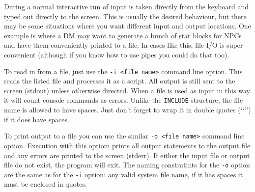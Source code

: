 During a normal interactive run of \progLogo input is taken directly from the
keyboard and typed out directly to the screen. This is usually the desired
behaviour, but there may be some situations where you want different input and
output locations. One example is where a DM may want to generate a bunch of
stat blocks for NPCs and have them conveniently printed to a file. In cases like
this, file I/O is super convenient (although if you know how to use pipes you
could do that too).

To read in from a file, just use the \texttt{-i~<file name>} command line
option. This reads the listed file and processes it as a script. All output
is still sent to the screen (stdout) unless otherwise directed. When a file
is used as input in this way it will count console commands as errors. Unlike
the \texttt{INCLUDE} structure, the file name is allowed to have spaces. Just
don't forget to wrap it in double quotes (\lq\lq \rq\rq) if it does have spaces.

To print output to a file you can use the similar \texttt{-o~<file name>}
command line option. Execution with this optioin prints all output statements
to the output file and any errors are printed to the screen (stderr). If either
the input file or output file do not exist, the program will exit. The naming
constratints for the \texttt{-o} option are the same as for the \texttt{-i}
option: any valid system file name, if it has spaces it must be enclosed in
quotes.
